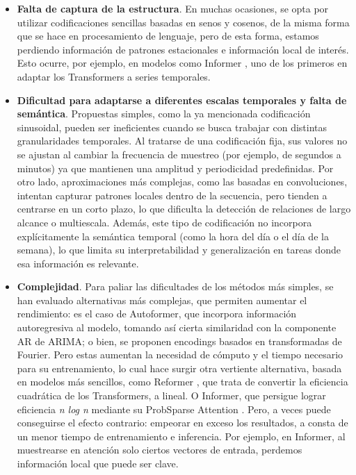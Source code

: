 \begin{itemize}
	\item \textbf{Falta de captura de la estructura}. En muchas ocasiones, se opta por utilizar codificaciones sencillas basadas en senos y cosenos, de la misma forma que se hace en procesamiento de lenguaje, pero de esta forma, estamos perdiendo información de patrones estacionales e información local de interés. Esto ocurre, por ejemplo, en modelos como Informer \cite{zhou2021informerefficienttransformerlong}, uno de los primeros en adaptar los Transformers a series temporales.

	\item \textbf{Dificultad para adaptarse a diferentes escalas temporales y falta de semántica}. Propuestas simples, como la ya mencionada codificación sinusoidal, pueden ser ineficientes cuando se busca trabajar con distintas granularidades temporales. Al tratarse de una codificación fija, sus valores no se ajustan al cambiar la frecuencia de muestreo (por ejemplo, de segundos a minutos) ya que mantienen una amplitud y periodicidad predefinidas. Por otro lado, aproximaciones más complejas, como las basadas en convoluciones, intentan capturar patrones locales dentro de la secuencia, pero tienden a centrarse en un corto plazo, lo que dificulta la detección de relaciones de largo alcance o multiescala. Además, este tipo de codificación no incorpora explícitamente la semántica temporal (como la hora del día o el día de la semana), lo que limita su interpretabilidad y generalización en tareas donde esa información es relevante.
	

	\item \textbf{Complejidad}. Para paliar las dificultades de los métodos más simples, se han evaluado alternativas más complejas, que permiten aumentar el rendimiento: es el caso de Autoformer, que incorpora información autoregresiva al modelo, tomando así cierta similaridad con la componente AR de ARIMA; o bien, se proponen encodings basados en transformadas de Fourier. Pero estas aumentan la necesidad de cómputo y el tiempo necesario para su entrenamiento, lo cual hace surgir otra vertiente alternativa, basada en modelos más sencillos, como Reformer \cite{kitaev2020reformerefficienttransformer}, que trata de convertir la eficiencia cuadrática de los Transformers, a lineal. O Informer, que persigue lograr eficiencia \textit{n log n} mediante su ProbSparse Attention \cite{zhou2021informerefficienttransformerlong}. Pero, a veces puede conseguirse el efecto contrario: empeorar en exceso los resultados, a consta de un menor tiempo de entrenamiento e inferencia. Por ejemplo, en Informer, al muestrearse en atención solo ciertos vectores de entrada, perdemos información local que puede ser clave.
\end{itemize}

